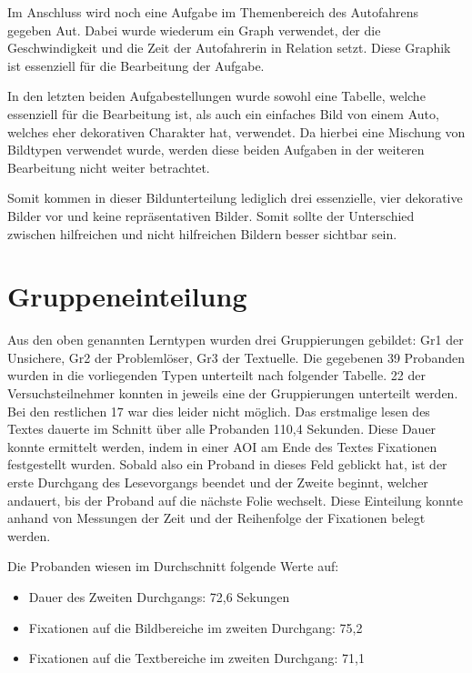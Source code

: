 Im Anschluss wird noch eine Aufgabe im Themenbereich des Autofahrens gegeben \gls{Aut}. Dabei wurde wiederum ein Graph verwendet, der die Geschwindigkeit und die Zeit der Autofahrerin in Relation setzt. Diese Graphik ist essenziell für die Bearbeitung der Aufgabe. 


In den letzten beiden Aufgabestellungen wurde sowohl eine Tabelle, welche essenziell für die Bearbeitung ist, als auch ein einfaches Bild von einem Auto, welches eher dekorativen Charakter hat, verwendet. Da hierbei eine Mischung von Bildtypen verwendet wurde, werden diese beiden Aufgaben in der weiteren Bearbeitung nicht weiter betrachtet. 

Somit kommen in dieser Bildunterteilung lediglich drei essenzielle, vier dekorative Bilder vor und keine repräsentativen Bilder. Somit sollte der Unterschied zwischen hilfreichen und nicht hilfreichen Bildern besser sichtbar sein.


\section{Gruppeneinteilung}

Aus den oben genannten Lerntypen wurden drei Gruppierungen gebildet: \gls{Gr1} der Unsichere, \gls{Gr2} der Problemlöser, \gls{Gr3} der Textuelle. Die gegebenen 39 Probanden wurden in die vorliegenden Typen unterteilt nach folgender Tabelle. 22 der Versuchsteilnehmer konnten in jeweils eine der Gruppierungen unterteilt werden. Bei den restlichen 17 war dies leider nicht möglich. Das erstmalige lesen des Textes dauerte im Schnitt über alle Probanden 110,4 Sekunden. Diese Dauer konnte ermittelt werden, indem in einer AOI am Ende des Textes Fixationen festgestellt wurden. Sobald also ein Proband in dieses Feld geblickt hat, ist der erste Durchgang des Lesevorgangs beendet und der Zweite beginnt, welcher andauert, bis der Proband auf die nächste Folie wechselt. Diese Einteilung konnte anhand von Messungen der Zeit und der Reihenfolge der Fixationen belegt werden. 


Die Probanden wiesen im Durchschnitt folgende Werte auf:
    \begin{itemize}
        \item Dauer des Zweiten Durchgangs: 72,6 Sekungen 
        \item Fixationen auf die Bildbereiche im zweiten Durchgang: 75,2
        \item Fixationen auf die Textbereiche im zweiten Durchgang: 71,1
    \end{itemize}

